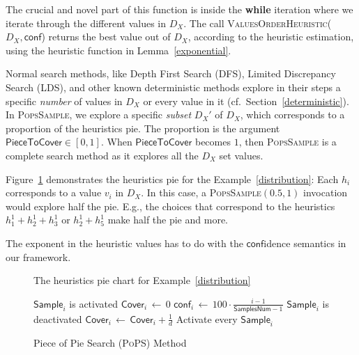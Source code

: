 \documentclass{ws-ijait}
\begin{document}
The crucial and novel part of this function is inside the \textbf{while} iteration where we iterate through the different values in $D_X$. The call \textsc{ValuesOrderHeuristic}($D_X, \mathsf{conf}$) returns the best value out of $D_X$, according to the heuristic estimation, using the heuristic function in Lemma~\ref{exponential}.

Normal search methods, like Depth First Search (DFS), %
Limited Discrepancy Search (LDS), and other known deterministic methods explore in their steps a specific \emph{number} of values in $D_X$ or every value in it (cf.\ Section~\ref{deterministic}). In \textsc{PopsSample}, we explore a specific \emph{subset} $D_X'$ of $D_X$, which corresponds to a proportion of the heuristics pie. The proportion is the argument $\mathsf{PieceToCover} \in [0,1]$. When $\mathsf{PieceToCover}$ becomes $1$, then \textsc{PopsSample} is a complete search method as it explores all the $D_X$ set values.
\begin{example}
Figure~\ref{piechart} demonstrates the heuristics pie for the Example~\ref{distribution}: Each $h_i$ corresponds to a value $v_i$ in $D_X$. In this case, a \textsc{PopsSample}$(0.5,1)$ invocation would explore half the pie. E.g., the choices that correspond to the heuristics $h_1^1 + h_2^1 + h_3^1$ or $h_2^1 + h_5^1$ make half the pie and more.
\end{example}
The exponent in the heuristic values has to do with the $\mathsf{conf}$idence semantics in our framework.

\begin{figure}
\centering

\caption{The heuristics pie chart for Example~\ref{distribution}\label{piechart}}
\end{figure}

\begin{figure}
\centering
\begin{algorithmic}
                \State  $\mathsf{Sample}_i$ is activated
                \State  $\mathsf{Cover}_i \, \gets \, 0$
                \State  $\mathsf{conf}_i  \, \gets \, 100 \cdot \frac{i-1}{\mathsf{SamplesNum}-1}$
        \EndFor
                                \State  $\mathsf{Sample}_i$ is deactivated
                        \EndIf
                        \State  $\mathsf{Cover}_i \, \gets \, \mathsf{Cover}_i + \frac{1}{d}$
                \EndFor
                        \State  Activate every $\mathsf{Sample}_i$
                \EndIf
        \EndWhile
\EndFunction
\end{algorithmic}
\caption{Piece of Pie Search ({\normalfont\textsc{PoPS}}) Method\label{pops}}
\end{figure}
\end{document}
